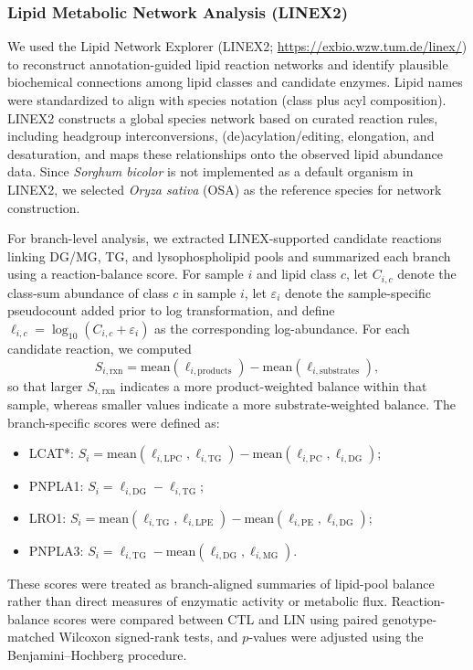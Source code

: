 \documentclass[9pt,twocolumn,twoside]{rilabRxiv}
\begin{document}
\subsubsection*{Lipid Metabolic Network Analysis (LINEX2)}

We used the Lipid Network Explorer (LINEX2; \url{https://exbio.wzw.tum.de/linex/}) to reconstruct annotation-guided lipid reaction networks and identify plausible biochemical connections among lipid classes and candidate enzymes. Lipid names were standardized to align with species notation (class plus acyl composition). LINEX2 constructs a global species network based on curated reaction rules, including headgroup interconversions, (de)acylation/editing, elongation, and desaturation, and maps these relationships onto the observed lipid abundance data. Since \textit{Sorghum bicolor} is not implemented as a default organism in LINEX2, we selected \textit{Oryza sativa} (OSA) as the reference species for network construction.

For branch-level analysis, we extracted LINEX-supported candidate reactions linking DG/MG, TG, and lysophospholipid pools and summarized each branch using a reaction-balance score. For sample \(i\) and lipid class \(c\), let \(C_{i,c}\) denote the class-sum abundance of class \(c\) in sample \(i\), let \(\varepsilon_i\) denote the sample-specific pseudocount added prior to log transformation, and define \(\ell_{i,c}=\log_{10}(C_{i,c}+\varepsilon_i)\) as the corresponding log-abundance. For each candidate reaction, we computed
\[
S_{i,\mathrm{rxn}}=\mathrm{mean}(\ell_{i,\mathrm{products}})-\mathrm{mean}(\ell_{i,\mathrm{substrates}}),
\]
so that larger \(S_{i,\mathrm{rxn}}\) indicates a more product-weighted balance within that sample, whereas smaller values indicate a more substrate-weighted balance. The branch-specific scores were defined as:
\begin{itemize}
\item LCAT*: \(S_i=\mathrm{mean}(\ell_{i,\mathrm{LPC}},\ell_{i,\mathrm{TG}})-\mathrm{mean}(\ell_{i,\mathrm{PC}},\ell_{i,\mathrm{DG}})\);
\item PNPLA1: \(S_i=\ell_{i,\mathrm{DG}}-\ell_{i,\mathrm{TG}}\);
\item LRO1: \(S_i=\mathrm{mean}(\ell_{i,\mathrm{TG}},\ell_{i,\mathrm{LPE}})-\mathrm{mean}(\ell_{i,\mathrm{PE}},\ell_{i,\mathrm{DG}})\);
\item PNPLA3: \(S_i=\ell_{i,\mathrm{TG}}-\mathrm{mean}(\ell_{i,\mathrm{DG}},\ell_{i,\mathrm{MG}})\).
\end{itemize}
These scores were treated as branch-aligned summaries of lipid-pool balance rather than direct measures of enzymatic activity or metabolic flux. Reaction-balance scores were compared between CTL and LIN using paired genotype-matched Wilcoxon signed-rank tests, and \(p\)-values were adjusted using the Benjamini--Hochberg procedure.
\end{document}

